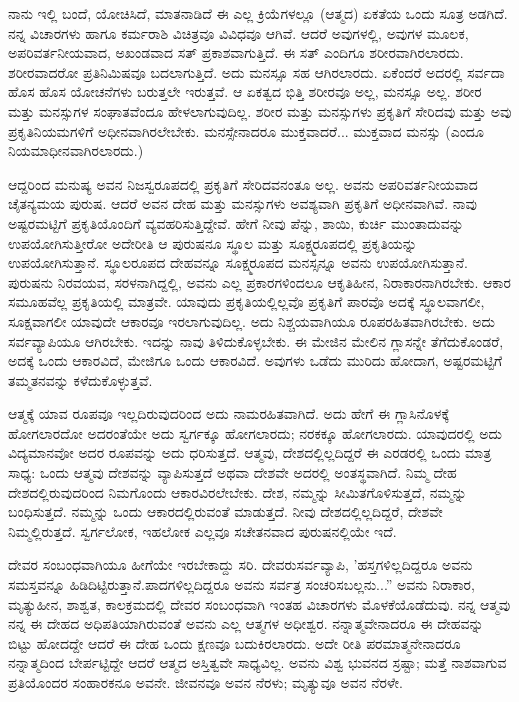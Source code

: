 ನಾನು ಇಲ್ಲಿ ಬಂದೆ, ಯೋಚಿಸಿದೆ, ಮಾತನಾಡಿದೆ ಈ ಎಲ್ಲ ಕ್ರಿಯೆಗಳಲ್ಲೂ (ಆತ್ಮದ) ಏಕತೆಯ ಒಂದು ಸೂತ್ರ ಅಡಗಿದೆ. ನನ್ನ ವಿಚಾರಗಳು ಹಾಗೂ ಕರ್ಮರಾಶಿ ವಿಚಿತ್ರವೂ ವಿವಿಧವೂ ಆಗಿವೆ. ಆದರೆ ಅವುಗಳಲ್ಲಿ, ಅವುಗಳ ಮೂಲಕ, ಅಪರಿವರ್ತನೀಯವಾದ, ಅಖಂಡವಾದ ಸತ್ ಪ್ರಕಾಶವಾಗುತ್ತಿದೆ. ಈ ಸತ್ ಎಂದಿಗೂ ಶರೀರವಾಗಿರಲಾರದು. ಶರೀರವಾದರೋ ಪ್ರತಿನಿಮಿಷವೂ ಬದಲಾಗುತ್ತಿದೆ. ಅದು ಮನಸ್ಸೂ ಸಹ ಆಗಿರಲಾರದು. ಏಕೆಂದರೆ ಅದರಲ್ಲಿ ಸರ್ವದಾ ಹೊಸ ಹೊಸ ಯೋಚನೆಗಳು ಬರುತ್ತಲೇ ಇರುತ್ತವೆ. ಆ ಏಕತ್ವದ ಭಿತ್ತಿ ಶರೀರವೂ ಅಲ್ಲ, ಮನಸ್ಸೂ ಅಲ್ಲ. ಶರೀರ ಮತ್ತು ಮನಸ್ಸುಗಳ ಸಂಘಾತವೆಂದೂ ಹೇಳಲಾಗುವುದಿಲ್ಲ. ಶರೀರ ಮತ್ತು ಮನಸ್ಸುಗಳು ಪ್ರಕೃತಿಗೆ ಸೇರಿದವು ಮತ್ತು ಅವು ಪ್ರಕೃತಿನಿಯಮಗಳಿಗೆ ಅಧೀನವಾಗಿರಲೇಬೇಕು. ಮನಸ್ಸೇನಾದರೂ ಮುಕ್ತವಾದರೆ... ಮುಕ್ತವಾದ ಮನಸ್ಸು (ಎಂದೂ ನಿಯಮಾಧೀನವಾಗಿರಲಾರದು.)

ಆದ್ದರಿಂದ ಮನುಷ್ಯ ಅವನ ನಿಜಸ್ವರೂಪದಲ್ಲಿ ಪ್ರಕೃತಿಗೆ ಸೇರಿದವನಂತೂ ಅಲ್ಲ. ಅವನು ಅಪರಿವರ್ತನೀಯವಾದ ಚೈತನ್ಯಮಯ ಪುರುಷ. ಆದರೆ ಅವನ ದೇಹ ಮತ್ತು ಮನಸ್ಸುಗಳು ಅವಶ್ಯವಾಗಿ ಪ್ರಕೃತಿಗೆ ಅಧೀನವಾಗಿವೆ. ನಾವು ಅಷ್ಟರಮಟ್ಟಿಗೆ ಪ್ರಕೃತಿಯೊಂದಿಗೆ ವ್ಯವಹರಿಸುತ್ತಿದ್ದೇವೆ. ಹೇಗೆ ನೀವು ಪೆನ್ನು, ಶಾಯಿ, ಕುರ್ಚಿ ಮುಂತಾದುವನ್ನು ಉಪಯೋಗಿಸುತ್ತೀರೋ ಅದೇರೀತಿ ಆ ಪುರುಷನೂ ಸ್ಥೂಲ ಮತ್ತು ಸೂಕ್ಷ್ಮರೂಪದಲ್ಲಿ ಪ್ರಕೃತಿಯನ್ನು ಉಪಯೋಗಿಸುತ್ತಾನೆ. ಸ್ಥೂಲರೂಪದ ದೇಹವನ್ನೂ ಸೂಕ್ಷ್ಮರೂಪದ ಮನಸ್ಸನ್ನೂ ಅವನು ಉಪಯೋಗಿಸುತ್ತಾನೆ. ಪುರುಷನು ನಿರವಯವ, ಸರಳನಾಗಿದ್ದಲ್ಲಿ, ಅವನು ಎಲ್ಲ ಪ್ರಕಾರಗಳಿಂದಲೂ ಆಕೃತಿಹೀನ, ನಿರಾಕಾರನಾಗಿರಬೇಕು. ಆಕಾರ ಸಮೂಹವೆಲ್ಲ ಪ್ರಕೃತಿಯಲ್ಲಿ ಮಾತ್ರವೇ. ಯಾವುದು ಪ್ರಕೃತಿಯಲ್ಲಿಲ್ಲವೊ ಪ್ರಕೃತಿಗೆ ಪಾರವೊ ಅದಕ್ಕೆ ಸ್ಥೂಲವಾಗಲೀ, ಸೂಕ್ಷವಾಗಲೀ ಯಾವುದೇ ಆಕಾರವೂ ಇರಲಾಗುವುದಿಲ್ಲ. ಅದು ನಿಶ್ಚಯವಾಗಿಯೂ ರೂಪರಹಿತವಾಗಿರಬೇಕು. ಅದು ಸರ್ವವ್ಯಾಪಿಯೂ ಆಗಿರಬೇಕು. ಇದನ್ನು ನಾವು ತಿಳಿದುಕೊಳ್ಳಬೇಕು. ಈ ಮೇಜಿನ ಮೇಲಿನ ಗ್ಲಾಸನ್ನೇ ತೆಗೆದುಕೊಂಡರೆ, ಅದಕ್ಕೆ ಒಂದು ಆಕಾರವಿದೆ, ಮೇಜಿಗೂ ಒಂದು ಆಕಾರವಿದೆ. ಅವುಗಳು ಒಡೆದು ಮುರಿದು ಹೋದಾಗ, ಅಷ್ಟರಮಟ್ಟಿಗೆ ತಮ್ಮತನವನ್ನು ಕಳೆದುಕೊಳ್ಳುತ್ತವೆ.

ಆತ್ಮಕ್ಕೆ ಯಾವ ರೂಪವೂ ಇಲ್ಲದಿರುವುದರಿಂದ ಅದು ನಾಮರಹಿತವಾಗಿದೆ. ಅದು ಹೇಗೆ ಈ ಗ್ಲಾಸಿನೊಳಕ್ಕೆ ಹೋಗಲಾರದೋ ಅದರಂತೆಯೇ ಅದು ಸ್ವರ್ಗಕ್ಕೂ ಹೋಗಲಾರದು; ನರಕಕ್ಕೂ ಹೋಗಲಾರದು. ಯಾವುದರಲ್ಲಿ ಅದು ವಿದ್ಯಮಾನವೋ ಅದರ ರೂಪವನ್ನು ಅದು ಧರಿಸುತ್ತದೆ. ಆತ್ಮವು, ದೇಶದಲ್ಲಿಲ್ಲದಿದ್ದರೆ ಈ ಎರಡರಲ್ಲಿ ಒಂದು ಮಾತ್ರ ಸಾಧ್ಯ: ಒಂದು ಆತ್ಮವು ದೇಶವನ್ನು ವ್ಯಾಪಿಸುತ್ತದೆ ಅಥವಾ ದೇಶವೇ ಅದರಲ್ಲಿ ಅಂತಸ್ಥವಾಗಿದೆ. ನಿಮ್ಮ ದೇಹ ದೇಶದಲ್ಲಿರುವುದರಿಂದ ನಿಮಗೊಂದು ಆಕಾರವಿರಲೇಬೇಕು. ದೇಶ, ನಮ್ಮನ್ನು ಸೀಮಿತಗೊಳಿಸುತ್ತದೆ, ನಮ್ಮನ್ನು ಬಂಧಿಸುತ್ತದೆ. ನಮ್ಮನ್ನು ಒಂದು ಆಕಾರದಲ್ಲಿರುವಂತೆ ಮಾಡುತ್ತದೆ. ನೀವು ದೇಶದಲ್ಲಿಲ್ಲದಿದ್ದರೆ, ದೇಶವೇ ನಿಮ್ಮಲ್ಲಿರುತ್ತದೆ. ಸ್ವರ್ಗಲೋಕ, ಇಹಲೋಕ ಎಲ್ಲವೂ ಸಚೇತನವಾದ ಪುರುಷನಲ್ಲಿಯೇ ಇದೆ.

ದೇವರ ಸಂಬಂಧವಾಗಿಯೂ ಹೀಗೆಯೇ ಇರಬೇಕಾದ್ದು ಸರಿ. ದೇವರು\break ಸರ್ವವ್ಯಾಪಿ, 'ಹಸ್ತಗಳಿಲ್ಲದಿದ್ದರೂ ಅವನು ಸಮಸ್ತವನ್ನೂ ಹಿಡಿದಿಟ್ಟಿರುತ್ತಾನೆ.\break ಪಾದಗಳಿಲ್ಲದಿದ್ದರೂ ಅವನು ಸರ್ವತ್ರ ಸಂಚರಿಸಬಲ್ಲನು...'' ಅವನು ನಿರಾಕಾರ, ಮೃತ್ಯುಹೀನ, ಶಾಶ್ವತ, ಕಾಲಕ್ರಮದಲ್ಲಿ ದೇವರ ಸಂಬಂಧವಾಗಿ ಇಂತಹ ವಿಚಾರಗಳು ಮೊಳಕೆಯೊಡೆದುವು. ನನ್ನ ಆತ್ಮವು ನನ್ನ ಈ ದೇಹದ ಅಧಿಪತಿಯಾಗಿರುವಂತೆ ಅವನು ಎಲ್ಲ ಆತ್ಮಗಳ ಅಧೀಶ್ವರ. ನನ್ನಾತ್ಮವೇನಾದರೂ ಈ ದೇಹವನ್ನು ಬಿಟ್ಟು ಹೋದದ್ದೇ ಆದರೆ ಈ ದೇಹ ಒಂದು ಕ್ಷಣವೂ ಬದುಕಿರಲಾರದು. ಅದೇ ರೀತಿ ಪರಮಾತ್ಮನೇನಾದರೂ ನನ್ನಾತ್ಮದಿಂದ ಬೇರ್ಪಟ್ಟಿದ್ದೇ ಆದರೆ ಆತ್ಮದ ಅಸ್ತಿತ್ವವೇ ಸಾಧ್ಯವಿಲ್ಲ. ಅವನು ವಿಶ್ವ ಭುವನದ ಸ್ರಷ್ಟಾ; ಮತ್ತೆ ನಾಶವಾಗುವ ಪ್ರತಿಯೊಂದರ ಸಂಹಾರಕನೂ ಅವನೇ. ಜೀವನವೂ ಅವನ ನೆರಳು; ಮೃತ್ಯುವೂ ಅವನ ನೆರಳೇ.

